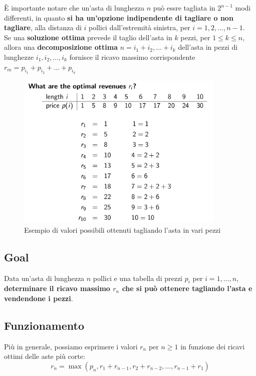 È importante notare che un'asta di lunghezza $n$ può essre tagliata in
$2^{n-1}$ modi differenti, in quanto \textbf{si ha un'opzione
  indipendente di tagliare o non tagliare}, alla distanza di $i$ pollici
dall'estremità sinistra, per $i = 1, 2, \ldots, n-1$.\\

Se una \textbf{soluzione ottima} prevede il taglio dell'asta in $k$
pezzi, per $1 \le k \le n$, allora una \textbf{decomposizione ottima}
$n = i_1 + i_2, \ldots + i_k$ dell'asta in pezzi di lunghezze
$i_1, i_2, \ldots, i_k$ fornisce il ricavo massimo corrispondente
$r_m = p_{i_1} + p_{i_2} + \ldots + p_{i_k}$

\begin{figure}[H]
  \centering
  \includegraphics[width=10cm, keepaspectratio]{capitoli/programmazione_dinamica/imgs/pole3.png}
  \caption{Esempio di valori possibili ottenuti tagliando l'asta in vari pezzi}

\end{figure}

\subsection{Goal}

Data un'asta di lunghezza $n$ pollici e una tabella di prezzi $p_i$
per $i = 1, \ldots, n$, \textbf{determinare il ricavo massimo $r_n$ che
  si può ottenere tagliando l'asta e vendendone i pezzi}.

\subsection{Funzionamento}

Più in generale, possiamo esprimere i valori $r_n$ per $n \ge 1$ in
funzione dei ricavi ottimi delle aste più corte:
$$
  r_n = \max(p_n, r_1 + r_{n-1}, r_2 + r_{n-2}, \ldots, r_{n-1} + r_1)
$$

